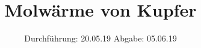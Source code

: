 

\subject{V47}
\title{Molwärme von Kupfer}
\date{
  Durchführung: 20.05.19
  \hspace{3em}
  Abgabe: 05.06.19
}



\maketitle
\thispagestyle{empty}
\tableofcontents
\newpage




%



\newpage
\printbibliography



